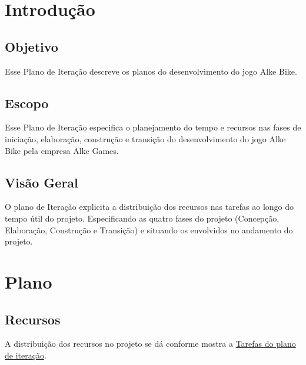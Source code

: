 \section{Introdução} 
\subsection{Objetivo}

Esse Plano de Iteração descreve os planos do desenvolvimento do jogo Alke Bike.

\subsection{Escopo}

Esse Plano de Iteração especifica o planejamento do tempo e recursos nas fases de iniciação, elaboração, construção e transição do desenvolvimento do jogo Alke Bike pela empresa Alke Games.

\subsection{Visão Geral}

O plano de Iteração explicita a distribuição dos recursos nas tarefas ao longo do tempo útil do projeto. Especificando as quatro fases do projeto (Concepção, Elaboração, Construção e Transição) e situando os envolvidos no andamento do projeto.

\section{Plano}

\subsection{Recursos}

	A distribuição dos recursos no projeto se dá conforme mostra a \hyperlink{tarefasPlanoIteracao}{Tarefas do plano de iteraç\~ao}.

